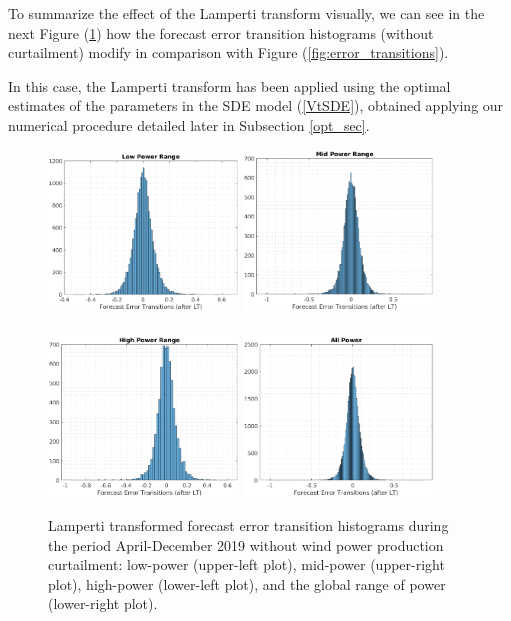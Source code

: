\documentclass[11pt]{article}
\theoremstyle{definition}
\begin{document}
To summarize the effect of the Lamperti transform visually, we can see in the next Figure (\ref{fig:LP_transitions}) how the forecast error transition histograms (without curtailment) modify in comparison with Figure (\ref{fig:error_transitions}).

In this case, the Lamperti transform has been applied using the optimal estimates of the parameters in the SDE model (\ref{VtSDE}), obtained applying our numerical procedure detailed later in Subsection \ref{opt_sec}.  

\begin{figure}[H]
\centering
\includegraphics[width=0.45\textwidth]{plots/LP_t_LP.eps}
\includegraphics[width=0.45\textwidth]{plots/MP_t_LP.eps}\\
\quad\\
\includegraphics[width=0.45\textwidth]{plots/HP_t_LP.eps}
\includegraphics[width=0.45\textwidth]{plots/AP_t_LP.eps}
\caption{Lamperti transformed forecast error transition histograms during the period April-December 2019 without wind power production curtailment: low-power (upper-left plot), mid-power (upper-right plot), high-power (lower-left plot), and the global range of power (lower-right plot).}
  \label{fig:LP_transitions}
\end{figure}
\end{document}
